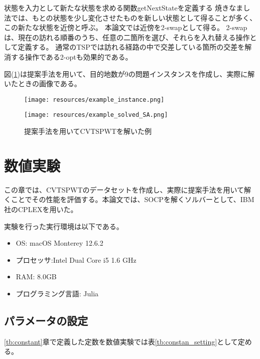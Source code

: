 \documentclass[11pt,a4paper,dvipdfmx,titlepage,uplatex]{jsarticle}
\theoremstyle{mystyle}
\newcommand{\0}{\mathbf{0}}
\begin{document}
	状態を入力として新たな状態を求める関数getNextStateを定義する
	焼きなまし法では、もとの状態を少し変化させたものを新しい状態として得ることが多く、この新たな状態を近傍と呼ぶ。
	本論文では近傍を2-swapとして得る。
	2-swapは、現在の訪れる順番のうち、任意の二箇所を選び、それらを入れ替える操作として定義する。
	通常のTSPでは訪れる経路の中で交差している箇所の交差を解消する操作である2-optも効果的である。
	
	
	図(\ref{fig:solved_by_proposed_method})は提案手法を用いて、目的地数が9の問題インスタンスを作成し、実際に解いたときの画像である。
	
	
	
	\begin{figure}[htbp]
		\begin{minipage}[l]{0.5\hsize}
			\centering
			\texttt{[image: resources/example\_instance.png]}
		\end{minipage} 
		\begin{minipage}[c]{0.5\hsize}
			\centering
			\texttt{[image: resources/example\_solved\_SA.png]}
		\end{minipage} 
		\caption{提案手法を用いてCVTSPWTを解いた例}
		\label{fig:solved_by_proposed_method}
	\end{figure}
	
	\clearpage
	\section{数値実験}\label{sec:Numerical_Experience}
	この章では、CVTSPWTのデータセットを作成し、実際に提案手法を用いて解くことでその性能を評価する。本論文では、SOCPを解くソルバーとして、IBM社のCPLEXを用いた。
	
	実験を行った実行環境は以下である。
	\begin{itemize}
		\item OS: macOS Monterey 12.6.2
		\item プロセッサ:Intel Dual Core i5 1.6 GHz
		\item RAM: 8.0GB
		\item プログラミング言語: Julia
	\end{itemize}
	
	\subsection{パラメータの設定}\label{sec:parameter_settings}
	\ref{tb:constant}章で定義した定数を数値実験では表\ref{tb:constan_setting}として定める。
	
\end{document}
